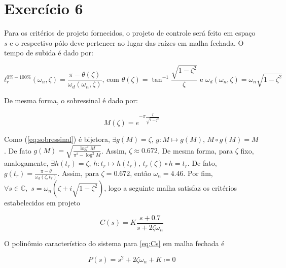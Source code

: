 \section*{Exercício 6}

    Para os critérios de projeto fornecidos, o projeto de controle será feito em espaço $s$ e o respectivo pólo deve pertencer ao lugar das raízes em malha fechada. O tempo de subida é dado por:
    
        \begin{equation}
            t^{0\% - 100\%}_{r}(\omega_n, \zeta) = \frac{\pi - \theta(\zeta)}{\omega_d(\omega_n, \zeta)} \mbox{, com } \theta(\zeta) = \tan^{-1}\frac{\sqrt{1 - \zeta^2}}{\zeta} \mbox{ e } \omega_d(\omega_n, \zeta) = \omega_n \sqrt{1-\zeta^2}
            \label{eq:tempo_de_subida}
        \end{equation}
    
    De mesma forma, o sobressinal é dado por:
    
        \begin{equation}
            M(\zeta) = e^{-\pi \frac{\zeta}{\sqrt{1-\zeta^2}}}
            \label{eq:sobressinal}
        \end{equation}
    
    Como (\ref{eq:sobressinal}) é bijetora, $\exists g(M) = \zeta \mbox{, } g: M \longmapsto g(M) \mbox{, } M \circ g (M) = M$. De fato $g(M) = \sqrt{\frac{\log^2{M}}{\pi^2 - \log^2{M}}}$. Assim, $\zeta \approx 0.672$. De mesma forma, para $\zeta$ fixo, analogamente, $\exists h(t_r) = \zeta\mbox{, }h: t_r \longmapsto h(t_r)\mbox{, } t_r(\zeta) \circ h = t_r$. De fato, $g(t_r) = \frac{\pi - \theta}{\omega_d(\zeta, t_r)}$. Assim, para $\zeta = 0.672$, então $\omega_n = 4.46$.
    Por fim, $\forall s \in \mathbb{C}, \,\, s = \omega_n (\zeta + i \sqrt{1 - \zeta^2})$, logo a seguinte malha satisfaz os critérios estabelecidos em projeto
    
        \begin{equation}
        C(s) = K \frac{s + 0.7}{s + 2 \zeta \omega_n}
        \label{eq:Cs}
        \end{equation}
    
    O polinômio característico do sistema para \eqref{eq:Cs} em malha fechada é 
    
        \begin{equation}
        P(s) = s^2 + 2\zeta \omega_n + K \coloneqq 0
        \label{eq:polcarac}
        \end{equation}
    
